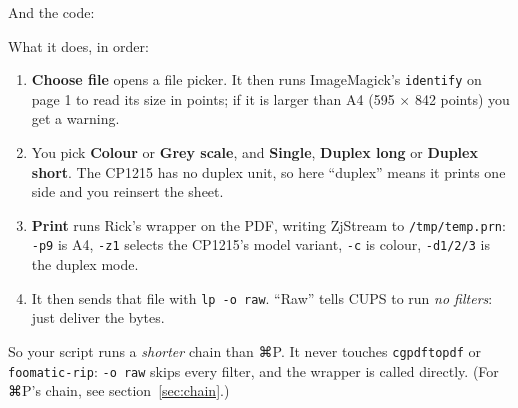 \documentclass[11pt,a4paper]{article}
\begin{document}
And the code:



What it does, in order:
\begin{enumerate}[nosep]
  \item \textbf{Choose file} opens a file picker. It then runs ImageMagick's \texttt{identify} on page 1 to read its size in points; if it is larger than A4 (595 $\times$ 842 points) you get a warning.
  \item You pick \textbf{Colour} or \textbf{Grey scale}, and \textbf{Single}, \textbf{Duplex long} or \textbf{Duplex short}. The CP1215 has no duplex unit, so here ``duplex'' means it prints one side and you reinsert the sheet.
  \item \textbf{Print} runs Rick's wrapper on the PDF, writing ZjStream to \texttt{/tmp/temp.prn}: \texttt{-p9} is A4, \texttt{-z1} selects the CP1215's model variant, \texttt{-c} is colour, \texttt{-d1/2/3} is the duplex mode.
  \item It then sends that file with \texttt{lp -o raw}. ``Raw'' tells CUPS to run \emph{no filters}: just deliver the bytes.
\end{enumerate}

So your script runs a \emph{shorter} chain than ⌘P. It never touches \texttt{cgpdftopdf} or \texttt{foomatic-rip}: \texttt{-o raw} skips every filter, and the wrapper is called directly. (For ⌘P's chain, see section~\ref{sec:chain}.)

\begin{center}
\end{center}
\end{document}
